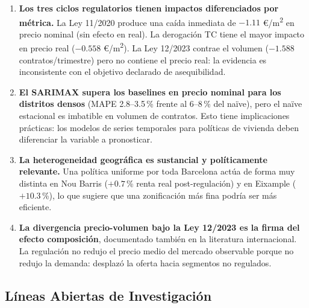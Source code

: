 \documentclass[12pt,a4paper]{article}
\begin{document}
\begin{enumerate}[leftmargin=*, itemsep=4pt]

\item \textbf{Los tres ciclos regulatorios tienen impactos diferenciados por métrica.}
La Ley 11/2020 produce una caída inmediata de $-1.11$ \euro/m\textsuperscript{2}
en precio nominal (sin efecto en real). La derogación TC tiene el mayor impacto en
precio real ($-0.558$ \euro/m\textsuperscript{2}). La Ley 12/2023 contrae el
volumen ($-1.588$ contratos/trimestre) pero no contiene el precio real: la evidencia
es inconsistente con el objetivo declarado de asequibilidad.

\item \textbf{El SARIMAX supera los baselines en precio nominal para los distritos
densos} (MAPE 2.8--3.5\,\% frente al 6--8\,\% del naïve), pero el naïve estacional
es imbatible en volumen de contratos. Esto tiene implicaciones prácticas: los modelos
de series temporales para políticas de vivienda deben diferenciar la variable a
pronosticar.

\item \textbf{La heterogeneidad geográfica es sustancial y políticamente relevante.}
Una política uniforme por toda Barcelona actúa de forma muy distinta en Nou Barris
($+0.7$\,\% renta real post-regulación) y en Eixample ($+10.3$\,\%), lo que sugiere
que una zonificación más fina podría ser más eficiente.

\item \textbf{La divergencia precio-volumen bajo la Ley 12/2023 es la firma del
efecto composición}, documentado también en la literatura internacional. La regulación
no redujo el precio medio del mercado observable porque no redujo la demanda: desplazó
la oferta hacia segmentos no regulados.

\end{enumerate}

\subsection{Líneas Abiertas de Investigación}
\end{document}
